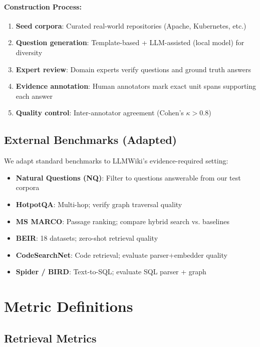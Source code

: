 \paragraph{Construction Process:}
\begin{enumerate}
  \item \textbf{Seed corpora}: Curated real-world repositories (Apache, Kubernetes, etc.)
  \item \textbf{Question generation}: Template-based + LLM-assisted (local model) for diversity
  \item \textbf{Expert review}: Domain experts verify questions and ground truth answers
  \item \textbf{Evidence annotation}: Human annotators mark exact unit spans supporting each answer
  \item \textbf{Quality control}: Inter-annotator agreement (Cohen's $\kappa > 0.8$)
\end{enumerate}

\subsection{External Benchmarks (Adapted)}
\label{sec:eval:external}

We adapt standard benchmarks to LLMWiki's evidence-required setting:

\begin{itemize}
  \item \textbf{Natural Questions (NQ)}: Filter to questions answerable from our test corpora
  \item \textbf{HotpotQA}: Multi-hop; verify graph traversal quality
  \item \textbf{MS MARCO}: Passage ranking; compare hybrid search vs. baselines
  \item \textbf{BEIR}: 18 datasets; zero-shot retrieval quality
  \item \textbf{CodeSearchNet}: Code retrieval; evaluate parser+embedder quality
  \item \textbf{Spider / BIRD}: Text-to-SQL; evaluate SQL parser + graph
\end{itemize}

\section{Metric Definitions}
\label{sec:eval:metrics}

\subsection{Retrieval Metrics}
\label{sec:eval:retrieval-metrics}

